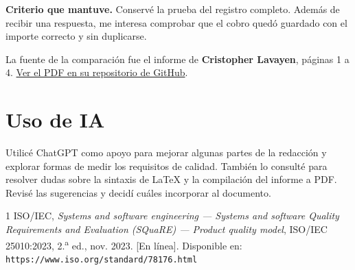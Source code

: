 \documentclass[11pt,a4paper]{article}
\begin{document}
\textbf{Criterio que mantuve.} Conservé la prueba del registro completo.
Además de recibir una respuesta, me interesa comprobar que el cobro quedó
guardado con el importe correcto y sin duplicarse.

La fuente de la comparación fue el informe de \textbf{Cristopher Lavayen},
páginas 1 a 4. \href{https://github.com/clavayenb-2026/ISR401-LavayenCristopher/blob/main/FORM-TL-01/main.pdf}{Ver el PDF en su repositorio de GitHub}.

\section{Uso de IA}

Utilicé ChatGPT como apoyo para mejorar algunas partes de la redacción y
explorar formas de medir los requisitos de calidad. También lo consulté para
resolver dudas sobre la sintaxis de LaTeX y la compilación del informe a PDF.
Revisé las sugerencias y decidí cuáles incorporar al documento.

\renewcommand{\refname}{Referencias}
\begin{thebibliography}{1}
ISO/IEC, \emph{Systems and software engineering --- Systems and software
Quality Requirements and Evaluation (SQuaRE) --- Product quality model},
ISO/IEC 25010:2023, 2.\textsuperscript{a} ed., nov. 2023.
[En línea]. Disponible en: \texttt{https://www.iso.org/standard/78176.html}
\end{thebibliography}
\end{document}
